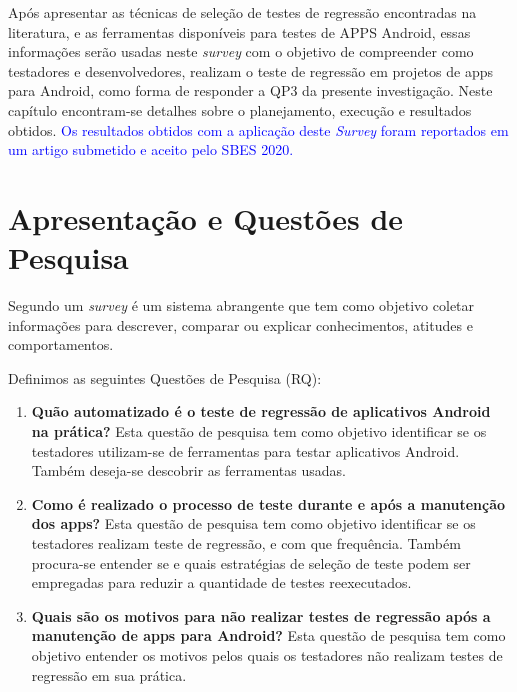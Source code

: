 \acresetall 

Após apresentar as técnicas de seleção de testes de regressão encontradas na literatura, e as ferramentas disponíveis para testes de \ac{APPS} Android, essas informações serão usadas neste \textit{survey} com o objetivo de compreender como testadores e desenvolvedores, realizam o teste de regressão em projetos de apps para Android, como forma de responder a QP3 da presente investigação. Neste capítulo encontram-se detalhes sobre o planejamento, execução e resultados obtidos.
\textcolor{blue}{Os resultados obtidos com a aplicação deste \textit{Survey} foram reportados em um artigo submetido e aceito pelo SBES 2020.}


\section{Apresentação e Questões de Pesquisa}\label{rqsurvey}

Segundo \cite{PSK2001} um \textit{survey} é um sistema abrangente que tem como objetivo coletar informações para descrever, comparar ou explicar conhecimentos, atitudes e comportamentos. %

Definimos as seguintes Questões de Pesquisa (RQ):

\begin{enumerate}[label=\bf QP\arabic*,leftmargin=1.8cm]
    
    \item \textbf{Quão automatizado é o teste de regressão de aplicativos Android na prática?} Esta questão de pesquisa tem como objetivo identificar se os testadores utilizam-se de ferramentas para testar aplicativos Android. Também deseja-se descobrir as ferramentas usadas.
    
    \item \textbf{Como é realizado o processo de teste durante e após a manutenção dos apps?} Esta questão de pesquisa tem como objetivo identificar se os testadores realizam teste de regressão, e com que frequência. Também procura-se entender se e quais estratégias de seleção de teste podem ser empregadas para reduzir a quantidade de testes reexecutados.
    
    \item \textbf{Quais são os motivos para não realizar testes de regressão após a manutenção de apps para Android?} Esta questão de pesquisa tem como objetivo entender os motivos pelos quais os testadores não realizam testes de regressão em sua prática.
    
\end{enumerate}

